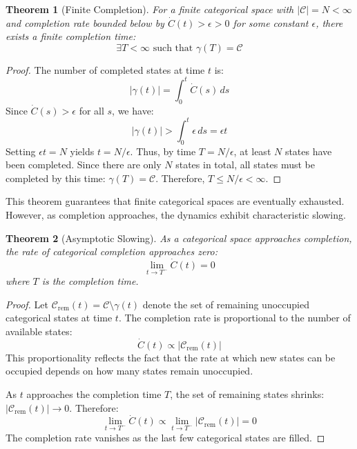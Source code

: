 \documentclass[12pt,a4paper]{article}
\newtheorem{theorem}{Theorem}[section]
\theoremstyle{definition}
\theoremstyle{remark}
\begin{document}
\begin{theorem}[Finite Completion]
\label{thm:finite_completion}
For a finite categorical space with $|\mathcal{C}| = N < \infty$ and completion rate bounded below by $\dot{C}(t) > \epsilon > 0$ for some constant $\epsilon$, there exists a finite completion time:
\begin{equation}
\exists T < \infty \text{ such that } \gamma(T) = \mathcal{C}
\end{equation}
\end{theorem}

\begin{proof}
The number of completed states at time $t$ is:
\begin{equation}
|\gamma(t)| = \int_0^t \dot{C}(s) \, ds
\end{equation}
Since $\dot{C}(s) > \epsilon$ for all $s$, we have:
\begin{equation}
|\gamma(t)| > \int_0^t \epsilon \, ds = \epsilon t
\end{equation}
Setting $\epsilon t = N$ yields $t = N/\epsilon$. Thus, by time $T = N/\epsilon$, at least $N$ states have been completed. Since there are only $N$ states in total, all states must be completed by this time: $\gamma(T) = \mathcal{C}$. Therefore, $T \leq N/\epsilon < \infty$.
\end{proof}

This theorem guarantees that finite categorical spaces are eventually exhausted. However, as completion approaches, the dynamics exhibit characteristic slowing.

\begin{theorem}[Asymptotic Slowing]
\label{thm:asymptotic}
As a categorical space approaches completion, the rate of categorical completion approaches zero:
\begin{equation}
\lim_{t \to T^-} \dot{C}(t) = 0
\end{equation}
where $T$ is the completion time.
\end{theorem}

\begin{proof}
Let $\mathcal{C}_{\text{rem}}(t) = \mathcal{C} \setminus \gamma(t)$ denote the set of remaining unoccupied categorical states at time $t$. The completion rate is proportional to the number of available states:
\begin{equation}
\dot{C}(t) \propto |\mathcal{C}_{\text{rem}}(t)|
\end{equation}
This proportionality reflects the fact that the rate at which new states can be occupied depends on how many states remain unoccupied.

As $t$ approaches the completion time $T$, the set of remaining states shrinks: $|\mathcal{C}_{\text{rem}}(t)| \to 0$. Therefore:
\begin{equation}
\lim_{t \to T^-} \dot{C}(t) \propto \lim_{t \to T^-} |\mathcal{C}_{\text{rem}}(t)| = 0
\end{equation}
The completion rate vanishes as the last few categorical states are filled.
\end{proof}
\end{document}
